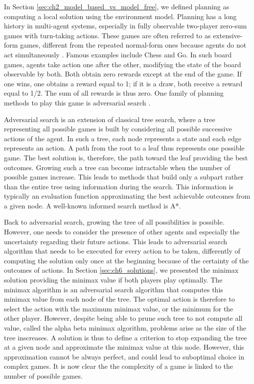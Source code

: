In Section \ref{sec:ch2_model_based_vs_model_free}, we defined planning as computing a local solution using the environment model.
Planning has a long history in multi-agent systems, especially in fully observable two-player zero-sum games with turn-taking actions.
These games are often referred to as extensive-form games, different from the repeated normal-form ones because agents do not act simultaneously \citep{Nowe2012GTMARL}.
Famous examples include Chess and Go.
In such board games, agents take action one after the other, modifying the state of the board observable by both.
Both obtain zero rewards except at the end of the game. 
If one wins, one obtains a reward equal to 1; if it is a draw, both receive a reward equal to 1/2.
The sum of all rewards is thus zero.
One family of planning methods to play this game is adversarial search \citep{russel2010}.

Adversarial search is an extension of classical tree search, where a tree representing all possible games is built by considering all possible successive actions of the agent.
In such a tree, each node represents a state and each edge represents an action. 
A path from the root to a leaf thus represents one possible game.
The best solution is, therefore, the path toward the leaf providing the best outcomes.
Growing such a tree can become intractable when the number of possible games increase.
This leads to methods that build only a subpart rather than the entire tree using information during the search.
This information is typically an evaluation function approximating the best achievable outcomes from a given node.
A well-known informed search method is A*.

Back to adversarial search, growing the tree of all possibilities is possible.
However, one needs to consider the presence of other agents and especially the uncertainty regarding their future actions.
This leads to adversarial search algorithm that needs to be executed for every action to be taken, differently of computing the solution only once at the beginning because of the certainty of the outcomes of actions.
In Section \ref{sec:ch6_solutions}, we presented the minimax solution providing the minimax value if both players play optimally.
The minimax algorithm is an adversarial search algorithm that computes this minimax value from each node of the tree.
The optimal action is therefore to select the action with the maximum minimax value, or the minimum for the other player.
However, despite being able to prune such tree to not compute all value, called the alpha beta minimax algorithm, problems arise as the size of the tree inscreases.
A solution is thus to define a criterion to stop expanding the tree at a given node and approximate the minimax value at this node.
However, this approximation cannot be always perfect, and could lead to suboptimal choice in complex games.
It is now clear the the complexity of a game is linked to the number of possible games.

